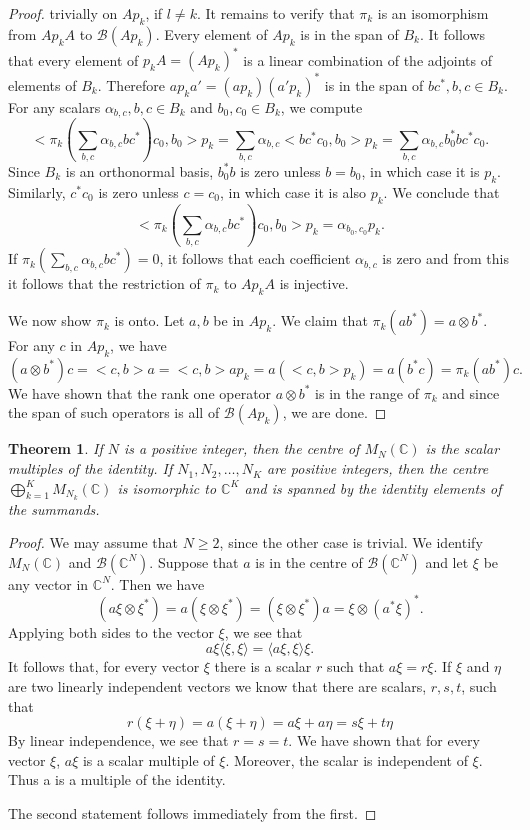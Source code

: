 \documentclass{book}
\newtheorem{theorem}[definition]{Theorem}
\begin{document}
\begin{proof}
  trivially on \(Ap_k\), if \(l\neq k\). It remains to verify that \(\pi_k\) is an
  isomorphism from \(Ap_k A\) to \(\mathcal{B}(Ap_k)\). Every element of \(Ap_k\) is in the span of
  \(B_k\). It follows that every element of \(p_k A = {(Ap_k)}^*\) is a linear combination of
  the adjoints of elements of \(B_k\). Therefore \(ap_k a'= (ap_k){(a'p_k)}^*\) is in the span
  of \(bc^*,b,c \in B_k\). For any scalars \(\alpha_{b,c},b,c \in B_k\) and \(b_0,c_0 \in B_k\), we compute
  \[
    <\pi_k\left(\sum_{b,c} \alpha_{b,c}bc^*\right) c_0,b_0 > p_k = 
    \sum_{b,c} \alpha_{b,c} < bc^*c_0,b_0 > p_k = 
    \sum_{b,c} \alpha_{b,c}b^*_0bc^*c_0.
  \]
  Since \(B_k\) is an orthonormal basis, \(b^*_0 b\) is zero unless \(b = b_0\), in which case it
  is \(p_k\). Similarly, \(c^*c_0\) is zero unless \(c = c_0\), in which case it is also \(p_k\). We
  conclude that
  \[
  <\pi_k \left(\sum_{b,c} \alpha_{b,c}bc^*\right) c_0,b_0 > p_k = \alpha_{b_0,c_0}  p_k.
  \]
  If \(\pi_k\left(\sum_{b,c}  \alpha _{b,c}bc^*\right) = 0\), it follows that each coefficient \(\alpha_{b,c}\) is zero and from
  this it follows that the restriction of \(\pi_k\) to \(Ap_k A\) is injective.\par
  We now show \(\pi_k\) is onto. Let \(a,b\) be in \(Ap_k\). We claim that \(\pi_k(ab^*) =
  a \otimes b^*\). For any \(c\) in \(Ap_k\), we have
  \[
  (a \otimes b^*)c =< c,b > a =< c,b > ap_k = a(< c,b > p_k) = a(b^*c) = \pi_k(ab^*)c.
  \]
  We have shown that the rank one operator \(a \otimes b^*\) is in the range of \(\pi_k\) and
  since the span of such operators is all of \(\mathcal{B}(Ap_k)\), we are done.
\end{proof}
\begin{theorem}\label{theorem:179}
  If \(N\) is a positive integer, then the centre of \(M_N(\mathbb{C})\) is the
  scalar multiples of the identity. If \(N_1,N_2,\ldots,N_K\) are positive integers, then
  the centre \(\bigoplus ^K_{k=1}M_{N_k}(\mathbb{C})\) is isomorphic to \(\mathbb{C}^K\) and is spanned by the identity
  elements of the summands.
\end{theorem}
\begin{proof}
  We may assume that \(N \geq 2\), since the other case is trivial. We identify
  \(M_N(\mathbb{C})\) and \(\mathcal{B}(\mathbb{C}^N)\). Suppose that \(a\) is in the centre of \(\mathcal{B}(\mathbb{C}^N)\) and let \(\xi\) be
  any vector in \(\mathbb{C}^N\). Then we have
  \[
  (a\xi \otimes \xi^*) = a(\xi \otimes\xi^*) = (\xi \otimes\xi^*)a = \xi \otimes{(a^*\xi)}^*.
  \]
  Applying both sides to the vector \(\xi\), we see that
  \[
    a\xi\langle\xi,\xi\rangle
    =\langle a\xi,\xi\rangle\xi.
  \]
  It follows that, for every vector \(\xi\) there is a scalar \(r\) such that \(a\xi = r\xi\). If \(\xi\)
  and \(\eta\) are two linearly independent vectors we know that there are scalars,
  \(r, s, t\), such that
  \[r(\xi +\eta) = a(\xi +\eta) = a\xi +a\eta = s\xi+t\eta\]
  By linear independence, we see that \(r = s = t\). We have shown that for every
  vector \(\xi\), \(a\xi\) is a scalar multiple of \(\xi\). Moreover, the scalar is independent of
  \(\xi\). Thus a is a multiple of the identity.\par
  The second statement follows immediately from the first.
\end{proof}
\end{document}
